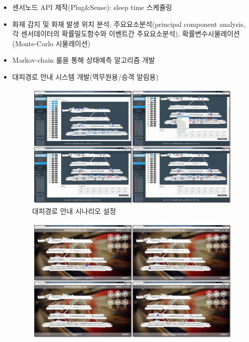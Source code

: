 \begin{itemize}
\begin{itemize}
\begin{figure}[!ht]
		            \end{figure}
		      \item 센서노드 API 제작(Plug\&Sense): sleep time 스케쥴링
		      \item 화재 감지 및 화재 발생 위치 분석: 주요요소분석(principal component analysis, 각 센서데이터의 확률밀도함수와 이벤트간 주요요소분석), 확률변수시물레이션(Monte-Carlo 시물레이션)
		      \item Markov-chain 룰을 통해 상태예측 알고리즘 개발
		      \item 대피경로 안내 시스템 개발(역무원용/승객 알림용)
		            \begin{figure}[ht!]
			            \begin{fullwidth}
				            \centering
				            \includegraphics[width=1.2\textwidth]{images/m2m_03.png}
				            \caption*{대피경로 안내 시나리오 설정}
			            \end{fullwidth}
		            \end{figure}
		            \begin{figure}[ht!]
			            \begin{fullwidth}
				            \centering
				            \includegraphics[width=1.2\textwidth]{images/m2m_04.png}

\end{fullwidth}
\end{figure}
\end{itemize}
\end{itemize}
